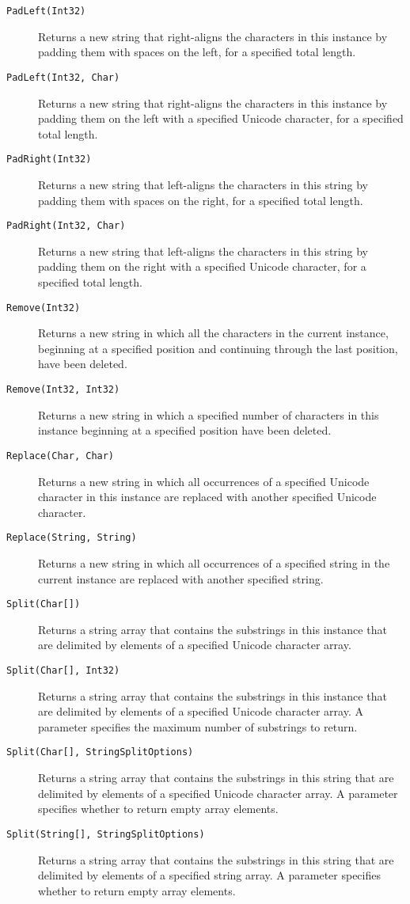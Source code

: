 \begin{description}
\item[\texttt{PadLeft(Int32)}] Returns a new string that right-aligns the characters in this instance by padding them with spaces on the left, for a specified total length.
\item[\texttt{PadLeft(Int32, Char)}] Returns a new string that right-aligns the characters in this instance by padding them on the left with a specified Unicode character, for a specified total length.
\item[\texttt{PadRight(Int32)}] Returns a new string that left-aligns the characters in this string by padding them with spaces on the right, for a specified total length.
\item[\texttt{PadRight(Int32, Char)}] Returns a new string that left-aligns the characters in this string by padding them on the right with a specified Unicode character, for a specified total length.
\item[\texttt{Remove(Int32)}] Returns a new string in which all the characters in the current instance, beginning at a specified position and continuing through the last position, have been deleted.
\item[\texttt{Remove(Int32, Int32)}] Returns a new string in which a specified number of characters in this instance beginning at a specified position have been deleted.
\item[\texttt{Replace(Char, Char)}] Returns a new string in which all occurrences of a specified Unicode character in this instance are replaced with another specified Unicode character.
\item[\texttt{Replace(String, String)}] Returns a new string in which all occurrences of a specified string in the current instance are replaced with another specified string.
\item[\texttt{Split(Char[])}] Returns a string array that contains the substrings in this instance that are delimited by elements of a specified Unicode character array.
\item[\texttt{Split(Char[], Int32)}] Returns a string array that contains the substrings in this instance that are delimited by elements of a specified Unicode character array. A parameter specifies the maximum number of substrings to return.
\item[\texttt{Split(Char[], StringSplitOptions)}] Returns a string array that contains the substrings in this string that are delimited by elements of a specified Unicode character array. A parameter specifies whether to return empty array elements.
\item[\texttt{Split(String[], StringSplitOptions)}] Returns a string array that contains the substrings in this string that are delimited by elements of a specified string array. A parameter specifies whether to return empty array elements.

\end{description}
